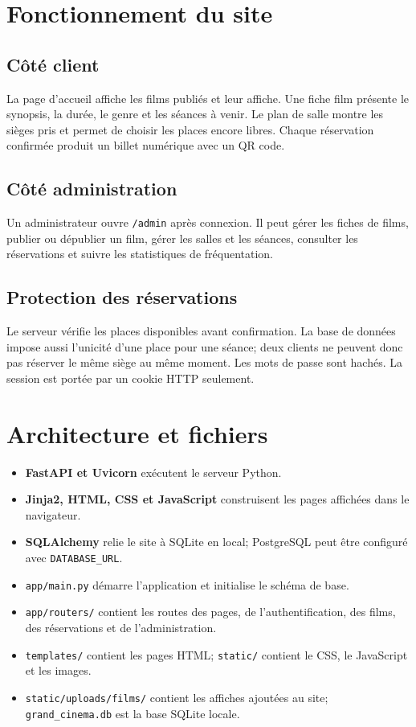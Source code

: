 \documentclass[11pt,a4paper]{article}
\begin{document}
\newpage
\section{Fonctionnement du site}
\subsection{Côté client}
La page d'accueil affiche les films publiés et leur affiche. Une fiche film présente le synopsis, la durée, le genre et les séances à venir. Le plan de salle montre les sièges pris et permet de choisir les places encore libres. Chaque réservation confirmée produit un billet numérique avec un QR code.

\subsection{Côté administration}
Un administrateur ouvre \texttt{/admin} après connexion. Il peut gérer les fiches de films, publier ou dépublier un film, gérer les salles et les séances, consulter les réservations et suivre les statistiques de fréquentation.

\subsection{Protection des réservations}
Le serveur vérifie les places disponibles avant confirmation. La base de données impose aussi l'unicité d'une place pour une séance; deux clients ne peuvent donc pas réserver le même siège au même moment. Les mots de passe sont hachés. La session est portée par un cookie HTTP seulement.

\section{Architecture et fichiers}
\begin{itemize}
  \item \textbf{FastAPI et Uvicorn} exécutent le serveur Python.
  \item \textbf{Jinja2, HTML, CSS et JavaScript} construisent les pages affichées dans le navigateur.
  \item \textbf{SQLAlchemy} relie le site à SQLite en local; PostgreSQL peut être configuré avec \texttt{DATABASE\_URL}.
  \item \texttt{app/main.py} démarre l'application et initialise le schéma de base.
  \item \texttt{app/routers/} contient les routes des pages, de l'authentification, des films, des réservations et de l'administration.
  \item \texttt{templates/} contient les pages HTML; \texttt{static/} contient le CSS, le JavaScript et les images.
  \item \texttt{static/uploads/films/} contient les affiches ajoutées au site; \texttt{grand\_cinema.db} est la base SQLite locale.
\end{itemize}
\end{document}
